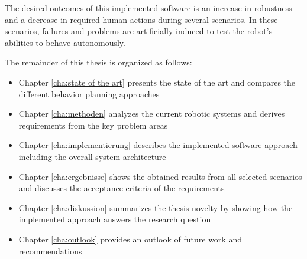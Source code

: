 The desired outcomes of this implemented software is an increase in robustness and a decrease in required human actions during several scenarios. In these scenarios, failures and problems are artificially induced to test the robot's abilities to behave autonomously. 

The remainder of this thesis is organized as follows:

\begin{itemize}
	\item Chapter \ref{cha:state of the art} presents the state of the art and compares the different behavior planning approaches
	
	\item Chapter \ref{cha:methoden} analyzes the current robotic systems and derives requirements from the key problem areas
	
	\item Chapter \ref{cha:implementierung} describes the implemented software approach including the overall system architecture 
	
	\item Chapter \ref{cha:ergebnisse} shows the obtained results from all selected scenarios and discusses the acceptance criteria of the requirements 
	
	\item Chapter \ref{cha:diskussion} summarizes the thesis novelty by showing how the implemented approach answers the research question
	
	\item Chapter \ref{cha:outlook} provides an outlook of future work and recommendations
\end{itemize}


